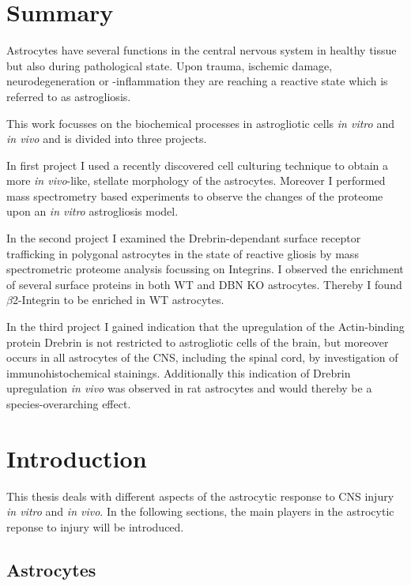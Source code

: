 \documentclass[a4paper,11pt,bibtotocnumbered]{article}
\begin{document}
\newpage
\section{Summary}

Astrocytes have several functions in the central nervous system in healthy tissue but also during pathological state.
Upon trauma, ischemic damage, neurodegeneration or -inflammation they are reaching a reactive state which is referred to as astrogliosis.

This work focusses on the biochemical processes in astrogliotic cells \textit{in vitro} and \textit{in vivo} and is divided into three projects.

In first project I used a recently discovered cell culturing technique to obtain a more \textit{in vivo}-like, stellate morphology of the astrocytes. Moreover I performed mass spectrometry based experiments to observe the changes of the proteome upon an \textit{in vitro} astrogliosis model. 

In the second project I examined the Drebrin-dependant surface receptor trafficking in polygonal astrocytes in the state of reactive gliosis by mass spectrometric proteome analysis focussing on Integrins. I observed the enrichment of several surface proteins in both WT and DBN KO astrocytes. Thereby I found $\beta$2-Integrin to be enriched in WT astrocytes. 

In the third project I gained indication that the upregulation of the Actin-binding protein Drebrin is not restricted to astrogliotic cells of the brain, but moreover occurs in all astrocytes of the CNS, including the spinal cord, by investigation of immunohistochemical stainings. Additionally this indication of Drebrin upregulation \textit{in vivo} was observed in rat astrocytes and would thereby be a species-overarching effect.





\newpage
{}
\endgroup
\setcounter{section}{0}
\section{Introduction}

This thesis deals with different aspects of the astrocytic response to  CNS injury \textit{in vitro} and \textit{in vivo}. In the following sections, the main players in the astrocytic reponse to injury will be introduced.

\subsection{Astrocytes}
\end{document}
